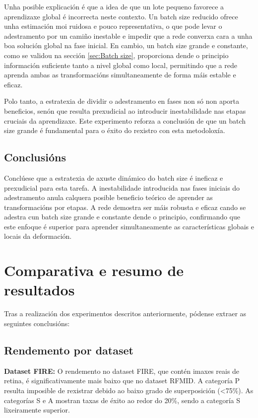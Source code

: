 Unha posible explicación é que a idea de que un lote pequeno favorece a aprendizaxe global é incorrecta neste contexto. Un batch size reducido ofrece unha estimación moi ruidosa e pouco representativa, o que pode levar o adestramento por un camiño inestable e impedir que a rede converxa cara a unha boa solución global na fase inicial. En cambio, un batch size grande e constante, como se validou na sección \ref{sec:Batch size}, proporciona dende o principio información suficiente tanto a nivel global como local, permitindo que a rede aprenda ambas as transformacións simultaneamente de forma máis estable e eficaz.

Polo tanto, a estratexia de dividir o adestramento en fases non só non aporta beneficios, senón que resulta prexudicial ao introducir inestabilidade nas etapas cruciais da aprendizaxe. Este experimento reforza a conclusión de que un batch size grande é fundamental para o éxito do rexistro con esta metodoloxía.

\subsection{Conclusións}
\label{subsec:Conclusions-phases}

Conclúese que a estratexia de axuste dinámico do batch size é ineficaz e prexudicial para esta tarefa. A inestabilidade introducida nas fases iniciais do adestramento anula calquera posible beneficio teórico de aprender as transformacións por etapas. A rede demostra ser máis robusta e eficaz cando se adestra cun batch size grande e constante dende o principio, confirmando que este enfoque é superior para aprender simultaneamente as características globais e locais da deformación.


\section{Comparativa e resumo de resultados}
\label{sec:Comparativa e resumo}

Tras a realización dos experimentos descritos anteriormente, pódense extraer as seguintes conclusións:

\subsection{Rendemento por dataset}
\label{subsec:Rendemento por dataset}

\textbf{Dataset FIRE:} O rendemento no dataset FIRE, que contén imaxes reais de retina, é significativamente mais baixo que no dataset RFMID. A categoría P resulta imposible de rexistrar debido ao baixo grado de superposición (<75\%). As categorías S e A mostran taxas de éxito ao redor do 20\%, sendo a categoría S lixeiramente superior.

